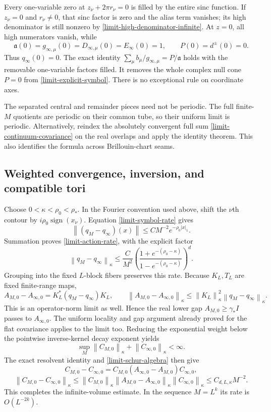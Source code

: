 \documentclass[11pt]{article}
\theoremstyle{remark}
\newcommand{\norm}[1]{\left\|#1\right\|}
\begin{document}
Every one-variable zero at $z_\nu+2\pi r_\nu=0$ is filled by the
entire sinc function. If $z_\nu=0$ and $r_\nu\ne0$, that sinc
factor is zero and the alias term vanishes; its high denominator is
still nonzero by \eqref{limit-high-denominator-infinite}. At $z=0$,
all high numerators vanish, while
\[
 \mathfrak a(0)=g_{\infty,\mu}(0)
 =D_{\infty,\mu}(0)=E_\infty(0)=1,
 \qquad P(0)=d^\pm(0)=0.
\]
Thus $q_\infty(0)=0$. The exact identity
$\sum_\mu b_\mu/g_{\infty,\mu}=P/\mathfrak a$ holds with
the removable one-variable factors filled. It removes the whole
complex null cone $P=0$ from \eqref{limit-explicit-symbol}.
There is no exceptional rule on coordinate axes.

The separated central and remainder pieces need not be periodic.
The full finite-$M$ quotients are periodic on their common tube,
so their uniform limit is periodic. Alternatively, reindex the
absolutely convergent full sum \eqref{limit-continuum-covariance}
on the real overlaps and apply the identity theorem. This also
identifies the formula across Brillouin-chart seams.

\subsection{Weighted convergence, inversion, and compatible tori}

Choose $0<\kappa<\rho_0<\rho_*$. In the Fourier convention used
above, shift the $\nu$th contour by $i\rho_0\operatorname{sign}(x_\nu)$.
Equation \eqref{limit-symbol-rate} gives
\[
 \norm{(q_M-q_\infty)(x)}
 \le CM^{-2}e^{-\rho_0|x|_1}.
\]
Summation proves \eqref{limit-action-rate}, with the explicit factor
\begin{equation}\label{limit-weighted-rate}
 \norm{q_M-q_\infty}_\kappa
 \le\frac{C}{M^2}
 \left(\frac{1+e^{-(\rho_0-\kappa)}}
            {1-e^{-(\rho_0-\kappa)}}\right)^d.
\end{equation}
Grouping into the fixed $L$-block fibers preserves this rate.
Because $K_L,T_L$ are fixed finite-range maps,
\[
 A_{M,0}-A_{\infty,0}=K_L^*(q_M-q_\infty)K_L,
 \qquad
 \norm{A_{M,0}-A_{\infty,0}}_\kappa
 \le\norm{K_L}_\kappa^2\norm{q_M-q_\infty}_\kappa.
\]
This is an operator-norm limit as well. Hence the real lower gap
$A_{M,0}\ge\gamma_*I$ passes to $A_{\infty,0}$.
The uniform locality and gap argument already proved for the flat
covariance applies to the limit too. Reducing the exponential weight
below the pointwise inverse-kernel decay exponent yields
\[
 \sup_M\norm{C_{M,0}}_\kappa+\norm{C_{\infty,0}}_\kappa<\infty.
\]
The exact resolvent identity and \eqref{limit-schur-algebra} then give
\[
 C_{M,0}-C_{\infty,0}
 =C_{M,0}(A_{\infty,0}-A_{M,0})C_{\infty,0},
\]
\[
 \norm{C_{M,0}-C_{\infty,0}}_\kappa
 \le\norm{C_{M,0}}_\kappa
     \norm{A_{M,0}-A_{\infty,0}}_\kappa
     \norm{C_{\infty,0}}_\kappa
 \le C_{d,L,\kappa}M^{-2}.
\]
This completes the infinite-volume estimate. In the sequence $M=L^k$
its rate is $O(L^{-2k})$.
\end{document}
